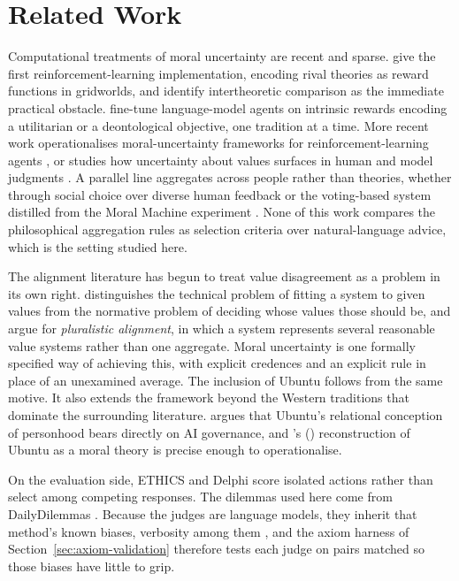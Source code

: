 \documentclass[10pt,twocolumn,a4paper]{article}
\let\cite\citep
\begin{document}
\section{Related Work}
\label{sec:related}


Computational treatments of moral uncertainty are recent and sparse.
\citet{ecoffet2021} give the first reinforcement-learning
implementation, encoding rival theories as reward functions in
gridworlds, and identify intertheoretic comparison as the immediate
practical obstacle. \citet{tennant2024} fine-tune language-model agents
on intrinsic rewards encoding a utilitarian or a deontological
objective, one tradition at a time. More recent work operationalises
moral-uncertainty frameworks for reinforcement-learning agents \cite{dubey2025},
or studies how uncertainty about values surfaces in human and model
judgments \cite{kwon2025}. A parallel line aggregates across people
rather than theories, whether through social choice over diverse human
feedback \cite{conitzer2024} or the voting-based system distilled from
the Moral Machine experiment \cite{awad2018,noothigattu2018}. None of
this work compares the philosophical aggregation rules as selection
criteria over natural-language advice, which is the setting studied
here.

The alignment literature has begun to treat value disagreement as a
problem in its own right. \citet{gabriel2020} distinguishes the
technical problem of fitting a system to given values from the
normative problem of deciding whose values those should be, and
\citet{sorensen2024} argue for \emph{pluralistic alignment}, in which a
system represents several reasonable value systems rather than one
aggregate. Moral uncertainty is one formally specified way of achieving
this, with explicit credences and an explicit rule in place of an
unexamined average. The inclusion of Ubuntu follows from the same
motive. It also extends the framework beyond the Western traditions that
dominate the surrounding literature. \citet{mhlambi2020} argues that Ubuntu's relational
conception of personhood bears directly on AI governance, and
\citeauthor{metz2007}'s (\citeyear{metz2007}) reconstruction of Ubuntu
as a moral theory is precise enough to operationalise.

On the evaluation side, ETHICS \cite{hendrycks2020} and Delphi
\cite{jiang2021} score isolated actions rather than select among
competing responses. The dilemmas used here come from DailyDilemmas
\cite{dailydilemmas2024}. Because the judges are language
models, they inherit that method's known biases, verbosity among them
\cite{zheng2023}, and the axiom harness of
Section~\ref{sec:axiom-validation} therefore tests each judge on pairs
matched so those biases have little to grip.
\end{document}
